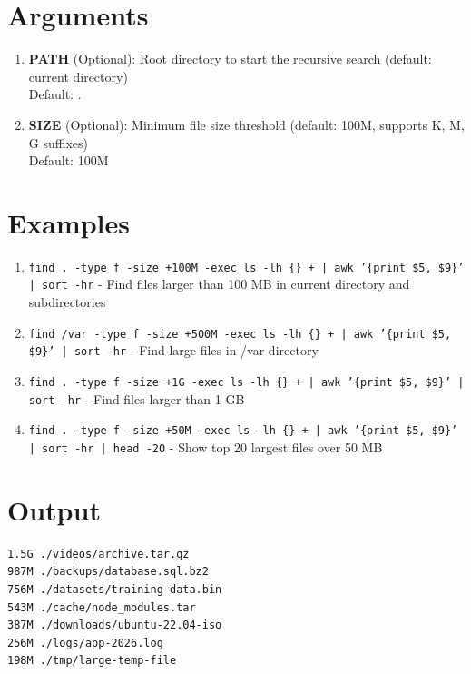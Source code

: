 \documentclass{article}
\begin{document}
\section*{Arguments}
\begin{enumerate}
  \item \textbf{PATH} (Optional): Root directory to start the recursive search (default: current directory) \\ Default: .
  \item \textbf{SIZE} (Optional): Minimum file size threshold (default: 100M, supports K, M, G suffixes) \\ Default: 100M
\end{enumerate}

\section*{Examples}
\begin{enumerate}
  \item \texttt{find . -type f -size +100M -exec ls -lh \{\} + | awk '\{print \$5, \$9\}' | sort -hr} - Find files larger than 100 MB in current directory and subdirectories
  \item \texttt{find /var -type f -size +500M -exec ls -lh \{\} + | awk '\{print \$5, \$9\}' | sort -hr} - Find large files in /var directory
  \item \texttt{find . -type f -size +1G -exec ls -lh \{\} + | awk '\{print \$5, \$9\}' | sort -hr} - Find files larger than 1 GB
  \item \texttt{find . -type f -size +50M -exec ls -lh \{\} + | awk '\{print \$5, \$9\}' | sort -hr | head -20} - Show top 20 largest files over 50 MB
\end{enumerate}

\section*{Output}
\begin{lstlisting}
1.5G ./videos/archive.tar.gz
987M ./backups/database.sql.bz2
756M ./datasets/training-data.bin
543M ./cache/node_modules.tar
387M ./downloads/ubuntu-22.04-iso
256M ./logs/app-2026.log
198M ./tmp/large-temp-file
\end{lstlisting}
\end{document}
